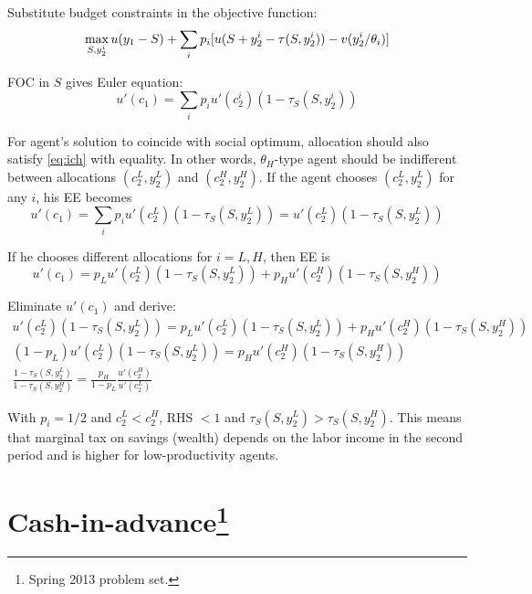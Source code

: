 \documentclass{article}
\begin{document}
\begin{enumerate}
{  Substitute budget constraints in the objective function:
  \begin{equation*}
        \max_{S,y_2^i} u(y_1-S)+\sum_ip_i[u(S + y_2^i - \tau(S,y_2^i))-v(y_2^i/\theta_i)]\\
  \end{equation*}

  FOC in $S$ gives Euler equation:
  \begin{equation*}
    u'(c_1)=\sum_ip_iu'(c_2^i)(1-\tau_S(S,y_2^i))
  \end{equation*}

  For agent's solution to coincide with social optimum, allocation
  should also satisfy \eqref{eq:ich} with equality. In other words,
  $\theta_H$-type agent should be indifferent between allocations
  $(c_2^L,y_2^L)$ and $(c_2^H,y_2^H)$. If the agent chooses
  $(c_2^L,y_2^L)$ for any $i$, his EE becomes
  \begin{equation*}
    u'(c_1)=\sum_ip_iu'(c_2^L)(1-\tau_S(S,y_2^L))=u'(c_2^L)(1-\tau_S(S,y_2^L))
  \end{equation*}

  If he chooses different allocations for $i=L,H$, then EE is
  \begin{equation*}
    u'(c_1)=p_Lu'(c_2^L)(1-\tau_S(S,y_2^L))+p_Hu'(c_2^H)(1-\tau_S(S,y_2^H))
  \end{equation*}
  
  Eliminate $u'(c_1)$ and derive:
  \begin{gather*}
    u'(c_2^L)(1-\tau_S(S,y_2^L))=p_Lu'(c_2^L)(1-\tau_S(S,y_2^L))+p_Hu'(c_2^H)(1-\tau_S(S,y_2^H))\\
    (1-p_L)u'(c_2^L)(1-\tau_S(S,y_2^L))=p_Hu'(c_2^H)(1-\tau_S(S,y_2^H))\\
    \frac{1-\tau_S(S,y_2^L)}{1-\tau_S(S,y_2^H)}=\frac{p_H}{1-p_L}\frac{u'(c_2^H)}{u'(c_2^L)}
  \end{gather*}  

  With $p_i=1/2$ and $c_2^L<c_2^H$, RHS $<1$ and
  $\tau_S(S,y_2^L)>\tau_S(S,y_2^H)$. This means that marginal tax on
  savings (wealth) depends on the labor income in the second period
  and is higher for low-productivity agents.

}


\end{enumerate}

\newpage

\section[]{Cash-in-advance\footnote{Spring 2013 problem set.}}
\end{document}
